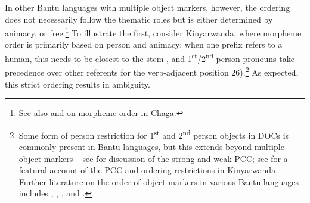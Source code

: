 \documentclass[output=paper
,modfonts
,nonflat]{langsci/langscibook}
\begin{document}
In other Bantu languages with multiple object markers, however, the ordering does not necessarily follow the thematic roles but is either determined by animacy, or free.\footnote{See also \citet{Bresnan_Moshi1990} and \citet{Alsina1996} on morpheme order in Chaga.} To illustrate the first, consider Kinyarwanda, where morpheme order is primarily based on person and animacy: when one prefix refers to a human, this needs to be closest to the stem , and 1\textsuperscript{st}/2\textsuperscript{nd} person pronouns take precedence over other referents for the verb-adjacent position 26).\footnote{Some form of person restriction for 1\textsuperscript{st} and 2\textsuperscript{nd} person objects in DOCs is commonly present in Bantu languages, but this extends beyond multiple object markers – see \citet{Riedel2009} for discussion of the strong and weak PCC; see \citet{Tomohiro2016} for a featural account of the PCC and ordering restrictions in Kinyarwanda. Further literature on the order of object markers in various Bantu languages includes \citet{Duranti1979}, \citet{Bresnan_Moshi1990}, \citet{Rugemalira1993}, and \citet{Alsina1996}.} As expected, this strict ordering results in ambiguity.
\end{document}
